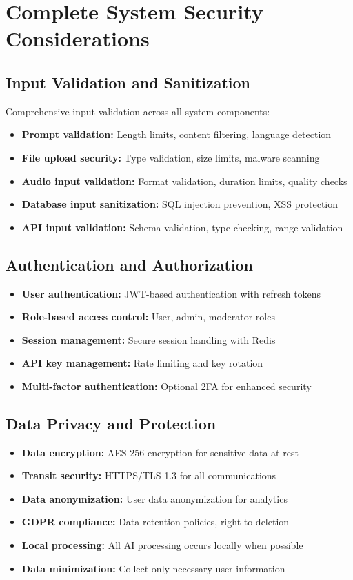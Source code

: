 {\section{Complete System Security Considerations}

\subsection{Input Validation and Sanitization}
Comprehensive input validation across all system components:
\begin{itemize}
    \item \textbf{Prompt validation:} Length limits, content filtering, language detection
    \item \textbf{File upload security:} Type validation, size limits, malware scanning
    \item \textbf{Audio input validation:} Format validation, duration limits, quality checks
    \item \textbf{Database input sanitization:} SQL injection prevention, XSS protection
    \item \textbf{API input validation:} Schema validation, type checking, range validation
\end{itemize}

\subsection{Authentication and Authorization}
\begin{itemize}
    \item \textbf{User authentication:} JWT-based authentication with refresh tokens
    \item \textbf{Role-based access control:} User, admin, moderator roles
    \item \textbf{Session management:} Secure session handling with Redis
    \item \textbf{API key management:} Rate limiting and key rotation
    \item \textbf{Multi-factor authentication:} Optional 2FA for enhanced security
\end{itemize}

\subsection{Data Privacy and Protection}
\begin{itemize}
    \item \textbf{Data encryption:} AES-256 encryption for sensitive data at rest
    \item \textbf{Transit security:} HTTPS/TLS 1.3 for all communications
    \item \textbf{Data anonymization:} User data anonymization for analytics
    \item \textbf{GDPR compliance:} Data retention policies, right to deletion
    \item \textbf{Local processing:} All AI processing occurs locally when possible
    \item \textbf{Data minimization:} Collect only necessary user information
\end{itemize}

}

